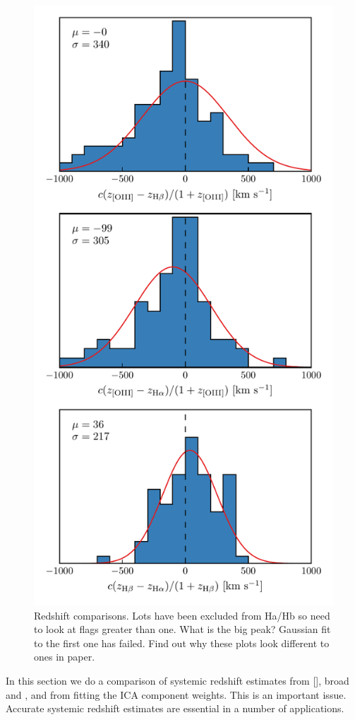 \begin{figure}
    \centering
    \includegraphics[width=0.8\linewidth]{figures/chapter04/redshift_comparison.pdf} 
    \caption{Redshift comparisons. Lots have been excluded from Ha/Hb so need to look at flags greater than one. What is the big peak? Gaussian fit to the first one has failed. Find out why these plots look different to ones in paper.}       
    \label{fig:redshift_comparison}
\end{figure}

In this section we do a comparison of systemic redshift estimates from [], broad \hb and \hans, and from fitting the ICA component weights. 
This is an important issue. 
Accurate systemic redshift estimates are essential in a number of applications. 

